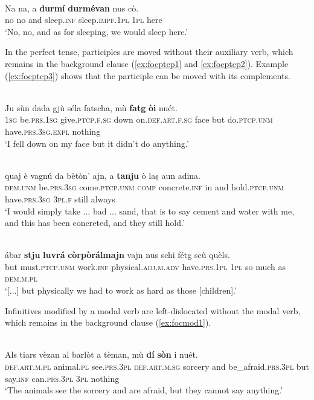 \ea
\label{ex:focverb2}
\\
\gll Na na, a \textbf{durmí} \textbf{durmévan} nus cò.\\
no no and sleep.\textsc{inf} sleep.\textsc{impf.1pl} \textsc{1pl} here \\
\glt `No, no, and as for sleeping, we would sleep here.'
\z

In the perfect tense, participles are moved without their auxiliary verb, which remains in the background clause (\ref{ex:focptcp1} and \ref{ex:focptcp2}). Example (\ref{ex:focptcp3}) shows that the participle can be moved with its complements.

\ea
\label{ex:focptcp1}
\\
\gll Ju sùn dada gjù séla fatscha, mù \textbf{fatg} \textbf{òi} nuét.\\
\textsc{1sg} be.\textsc{prs.1sg} give.\textsc{ptcp.f.sg} down on.\textsc{def.art.f.sg} face but do.\textsc{ptcp.unm} have.\textsc{prs.3sg.expl} nothing\\
\glt `I fell down on my face but it didn't do anything.'
\z

\ea
\label{ex:focptcp2}
\\
\gll  [...] quaj è vagnú da bètòn’ ajn, a \textbf{tanju} ò laṣ aun adina. \\
{} \textsc{dem.unm} be.\textsc{prs.3sg} come.\textsc{ptcp.unm} \textsc{comp} concrete.\textsc{inf} in and hold.\textsc{ptcp.unm} have.\textsc{prs.3sg} \textsc{3pl.f} still always \\
\glt `I would simply take ... bad ... sand, that is to say cement and water with me, and this has been concreted, and they still hold.'
\z

\ea
\label{ex:focptcp3}
\\
\gll [...] ábar \textbf{stju} \textbf{luvrá} \textbf{còrpòrálmajn} vajn nus schi fétg scù quèls.\\
{}	but must.\textsc{ptcp.unm} work.\textsc{inf} physical.\textsc{adj.m.adv} have.\textsc{prs.1pl} \textsc{1pl} so much as \textsc{dem.m.pl}\\
\glt `[...] but physically we had to work as hard as those [children].'
\z

Infinitives modified by a modal verb are left-dislocated without the modal verb, which remains in the background clause (\ref{ex:focmod1}).

\ea
\label{ex:focmod1}
\\
\gll Als tiars vèzan al barlòt a tèman, mù \textbf{dí} \textbf{sòn} i nuét.\\
     \textsc{def.art.m.pl} animal.\textsc{pl} see.\textsc{prs.3pl} \textsc{def.art.m.sg} sorcery and be\_afraid.\textsc{prs.3pl} but say.\textsc{inf} can.\textsc{prs.3pl} \textsc{3pl} nothing\\
\glt `The animals see the sorcery and are afraid, but they cannot say anything.'
\z


